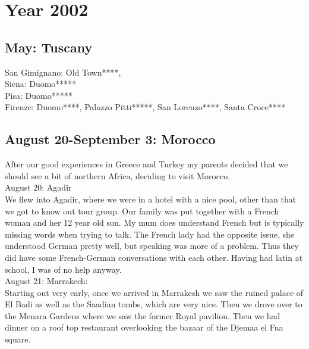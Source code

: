 \chapter{Year 2002}
\label{2002}

\section{May: Tuscany}
\label{2002:Tuscany}


San Gimignano: Old Town****,\\
Siena: Duomo*****\\
Pisa: Duomo*****\\
Firenze: Duomo****, Palazzo Pitti*****, San Lorenzo****, Santa Croce****

\section{August 20-September 3: Morocco}
\label{2002:Morocco}


After our good experiences in Greece and Turkey my parents decided that we should see a bit of northern Africa, deciding to visit Morocco.\\

August 20: Agadir\\
We flew into Agadir, where we were in a hotel with a nice pool, other than that we got to know out tour group. Our family was put together with a French woman and her 12 year old son. My mum does understand French but is typically missing words when trying to talk. The French lady had the opposite issue, she understood German pretty well, but speaking was more of a problem. Thus they did have some French-German conversations with each other. Having had latin at school, I was of no help anyway.\\

August 21: Marrakech:\\
Starting out very early, once we arrived in Marrakesh we saw the ruined palace of El Badi as well as the Saadian tombs, which are very nice. Then we drove over to the Menara Gardens where we saw the former Royal pavilion. Then we had dinner on a roof top restaurant overlooking the bazaar of the Djemaa el Fna square.\\

